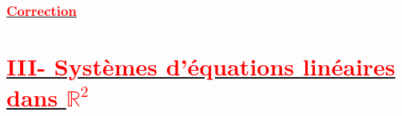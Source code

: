 \documentclass[12pt,a4paper]{article}
\newcounter{solution}
\begin{document}
\subsubsection*{\underline{\textcolor{red}{Correction}}}

\section*{\underline{\textcolor{red}{III- Systèmes d’équations linéaires dans $\mathbb{R}^2$}}}
\end{document}
